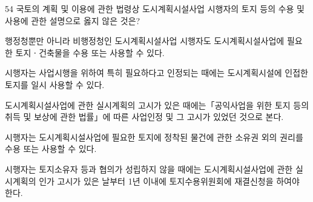 \begin{question}{54}
국토의 계획 및 이용에 관한 법령상 도시계획시설사업 시행자의 토지 등의 수용 및 사용에 관한 설명으로 옳지 않은 것은?
\begin{choices}
  \item 행정청뿐만 아니라 비행정청인 도시계획시설사업 시행자도 도시계획시설사업에 필요한 토지ㆍ건축물을 수용 또는 사용할 수 있다.
  \item 시행자는 사업시행을 위하여 특히 필요하다고 인정되는 때에는 도시계획시설에 인접한 토지를 일시 사용할 수 있다.
  \item 도시계획시설사업에 관한 실시계획의 고시가 있은 때에는「공익사업을 위한 토지 등의 취득 및 보상에 관한 법률」에 따른 사업인정 및 그 고시가 있었던 것으로 본다.
  \item 시행자는 도시계획시설사업에 필요한 토지에 정착된 물건에 관한 소유권 외의 권리를 수용 또는 사용할 수 있다.
  \item 시행자는 토지소유자 등과 협의가 성립하지 않을 때에는 도시계획시설사업에 관한 실시계획의 인가 고시가 있은 날부터 1년 이내에 토지수용위원회에 재결신청을 하여야 한다.
\end{choices}
\end{question}
